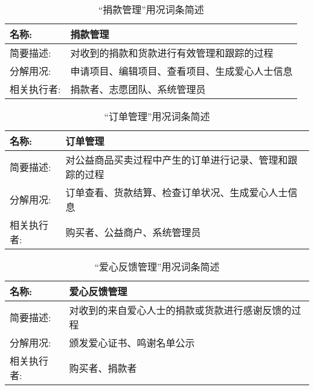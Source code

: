 \begin{table}[H]  
\caption{“捐款管理”用况词条简述}  
\begin{center}  
    \begin{tabular}{l p{11cm}} 
        \hline
        \quad 名称:  & 捐款管理 \\
        \hline
        \quad 简要描述:  & 对收到的捐款和货款进行有效管理和跟踪的过程 \\
        \hline
        \quad 分解用况:  & 申请项目、编辑项目、查看项目、生成爱心人士信息 \\
        \hline
        \quad 相关执行者:  & 捐款者、志愿团队、系统管理员 \\
        \hline
    \end{tabular}
    \label{tab1}
\end{center}
\end{table}

\begin{table}[H]  
\caption{“订单管理”用况词条简述}  
\begin{center}  
    \begin{tabular}{l p{11cm}} 
        \hline
        \quad 名称:  & 订单管理 \\
        \hline
        \quad 简要描述:  & 对公益商品买卖过程中产生的订单进行记录、管理和跟踪的过程 \\
        \hline
        \quad 分解用况:  & 订单查看、货款结算、检查订单状况、生成爱心人士信息 \\
        \hline
        \quad 相关执行者:  & 购买者、公益商户、系统管理员 \\
        \hline
    \end{tabular}
    \label{tab1}
\end{center}
\end{table}

\begin{table}[H]  
\caption{“爱心反馈管理”用况词条简述}  
\begin{center}  
    \begin{tabular}{l p{11cm}} 
        \hline
        \quad 名称:  & 爱心反馈管理 \\
        \hline
        \quad 简要描述:  & 对收到的来自爱心人士的捐款或货款进行感谢反馈的过程 \\
        \hline
        \quad 分解用况:  & 颁发爱心证书、鸣谢名单公示 \\
        \hline
        \quad 相关执行者:  & 购买者、捐款者 \\
        \hline
    \end{tabular}
    \label{tab1}
\end{center}
\end{table}

